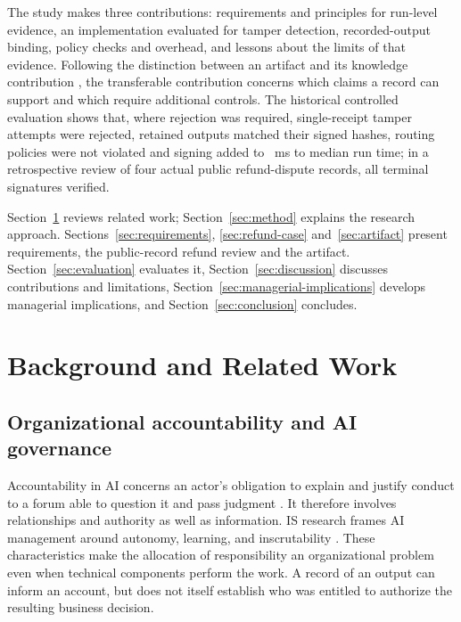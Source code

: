 \documentclass[11pt]{article}
\begin{document}
The study makes three contributions: requirements and principles for run-level evidence, an implementation evaluated for tamper detection, recorded-output binding, policy checks and overhead, and lessons about the limits of that evidence. Following the distinction between an artifact and its knowledge contribution \citep{gregor2013}, the transferable contribution concerns which claims a record can support and which require additional controls. The historical controlled evaluation shows that, where rejection was required, single-receipt tamper attempts were rejected, retained outputs matched their signed hashes, routing policies were not violated and signing added \CfourSignDeltaMinMs{} to \CfourSignDeltaMaxMs{}~ms to median run time; in a retrospective review of four actual public refund-dispute records, all \CfourPublicSignatures{} terminal signatures verified.

Section~\ref{sec:background} reviews related work; Section~\ref{sec:method} explains the research approach. Sections~\ref{sec:requirements}, \ref{sec:refund-case} and~\ref{sec:artifact} present requirements, the public-record refund review and the artifact. Section~\ref{sec:evaluation} evaluates it, Section~\ref{sec:discussion} discusses contributions and limitations, Section~\ref{sec:managerial-implications} develops managerial implications, and Section~\ref{sec:conclusion} concludes.

\section{Background and Related Work}\label{sec:background}

\subsection{Organizational accountability and AI governance}

Accountability in AI concerns an actor's obligation to explain and justify conduct to a forum able to question it and pass judgment \citep{wieringa2020,novelli2023}. It therefore involves relationships and authority as well as information. IS research frames AI management around autonomy, learning, and inscrutability \citep{berente2021}. These characteristics make the allocation of responsibility an organizational problem even when technical components perform the work. A record of an output can inform an account, but does not itself establish who was entitled to authorize the resulting business decision.
\end{document}

